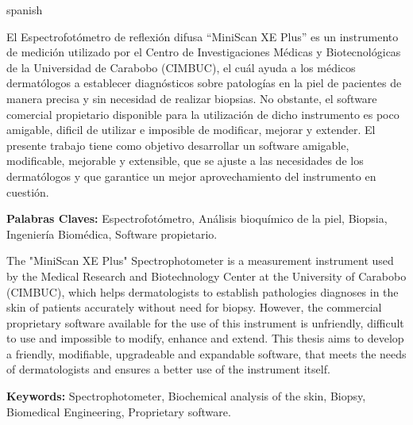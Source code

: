 \renewenvironment{abstract}{
  \vspace*{\fill}
  \begin{center}%
    \bfseries\abstractname
  \end{center}}%
  
\selectlanguage{spanish}

\begin{abstract}
	\noindent
El Espectrofot\'{o}metro de reflexi\'{o}n difusa ``MiniScan XE Plus'' es un instrumento de medici\'{o}n utilizado por el Centro de Investigaciones M\'{e}dicas y Biotecnol\'{o}gicas de la Universidad de Carabobo (CIMBUC), el cu\'{a}l ayuda a los m\'{e}dicos dermat\'{o}logos a establecer diagn\'{o}sticos sobre patolog\'{i}as en la piel de pacientes de manera precisa y sin necesidad de realizar biopsias. No obstante, el software comercial propietario disponible para la utilizaci\'{o}n de dicho instrumento es poco amigable, dificil de utilizar e imposible de modificar, mejorar y extender. El presente trabajo tiene como objetivo desarrollar un software amigable, modificable, mejorable y extensible, que se ajuste a las necesidades de los dermat\'{o}logos y que garantice un mejor aprovechamiento del instrumento en cuesti\'{o}n.

	\noindent
	\textbf{Palabras Claves:} Espectrofot\'{o}metro, An\'{a}lisis bioqu\'{i}mico de la piel, Biopsia, Ingenier\'{i}a Biom\'{e}dica, Software propietario.
	\vfill
\end{abstract}

\vfill

\begin{abstract}
	\noindent
The "MiniScan XE Plus" Spectrophotometer is a measurement instrument used by the Medical Research and Biotechnology Center at the University of Carabobo (CIMBUC), which helps dermatologists to establish pathologies diagnoses in the skin of patients accurately without need for biopsy. However, the commercial proprietary software available for the use of this instrument is unfriendly, difficult to use and impossible to modify, enhance and extend. This thesis aims to develop a friendly, modifiable, upgradeable and expandable software, that meets the needs of dermatologists and ensures a better use of the instrument itself.

	\noindent
	\textbf{Keywords:} Spectrophotometer, Biochemical analysis of the skin, Biopsy, Biomedical Engineering, Proprietary software.
	\vfill
\end{abstract}

